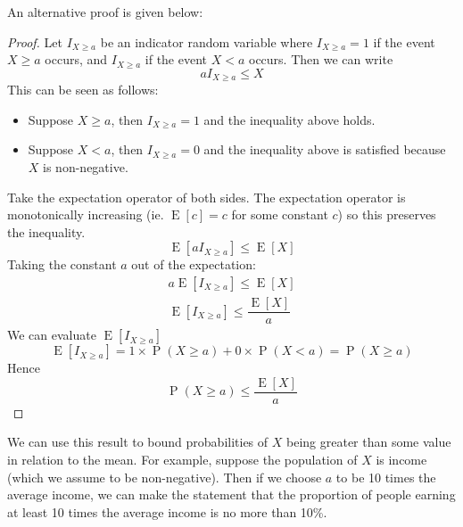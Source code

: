 \documentclass[11pt]{report} %
\begin{document}
An alternative proof is given below:
\begin{proof}
Let $I_{X \geq a}$ be an indicator random variable where $I_{X \geq a} = 1$ if the event $X \geq a$ occurs, and $I_{X \geq a}$ if the event $X < a$ occurs. Then we can write
\begin{equation}
aI_{X \geq a} \leq X
\end{equation}
This can be seen as follows:
\begin{itemize}
\item Suppose $X \geq a$, then $I_{X \geq a} = 1$ and the inequality above holds.
\item Suppose $X < a$, then $I_{X \geq a} = 0$ and the inequality above is satisfied because $X$ is non-negative.
\end{itemize}
Take the expectation operator of both sides. The expectation operator is monotonically increasing (ie. $\operatorname{E}\left[c\right] = c$ for some constant $c$) so this preserves the inequality.
\begin{equation}
\operatorname{E}\left[aI_{X \geq a}\right] \leq \operatorname{E}\left[X\right]
\end{equation}
Taking the constant $a$ out of the expectation:
\begin{gather}
a\operatorname{E}\left[I_{X \geq a}\right] \leq \operatorname{E}\left[X\right] \\
\operatorname{E}\left[I_{X \geq a}\right] \leq \dfrac{\operatorname{E}\left[X\right]}{a}
\end{gather}
We can evaluate $\operatorname{E}\left[I_{X \geq a}\right]$
\begin{equation}
\operatorname{E}\left[I_{X \geq a}\right] = 1\times\operatorname{P}\left(X\geq a\right) + 0\times\operatorname{P}\left(X < a\right) = \operatorname{P}\left(X\geq a\right)
\end{equation}
Hence
\begin{equation}
\operatorname{P}\left(X\geq a\right) \leq \dfrac{\operatorname{E}\left[X\right]}{a}
\end{equation}

\end{proof}
We can use this result to bound probabilities of $X$ being greater than some value in relation to the mean. For example, suppose the population of $X$ is income (which we assume to be non-negative). Then if we choose $a$ to be 10 times the average income, we can make the statement that the proportion of people earning at least 10 times the average income is no more than 10\%.
\end{document}
